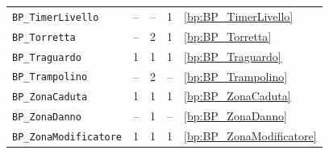 \begin{longtable}{lcccl}
\texttt{BP\_TimerLivello} & -- & -- & 1 & \ref{bp:BP_TimerLivello} \\
\texttt{BP\_Torretta} & -- & 2 & 1 & \ref{bp:BP_Torretta} \\
\texttt{BP\_Traguardo} & 1 & 1 & 1 & \ref{bp:BP_Traguardo} \\
\texttt{BP\_Trampolino} & -- & 2 & -- & \ref{bp:BP_Trampolino} \\
\texttt{BP\_ZonaCaduta} & 1 & 1 & 1 & \ref{bp:BP_ZonaCaduta} \\
\texttt{BP\_ZonaDanno} & -- & 1 & -- & \ref{bp:BP_ZonaDanno} \\
\texttt{BP\_ZonaModificatore} & 1 & 1 & 1 & \ref{bp:BP_ZonaModificatore} \\
\bottomrule
\end{longtable}
